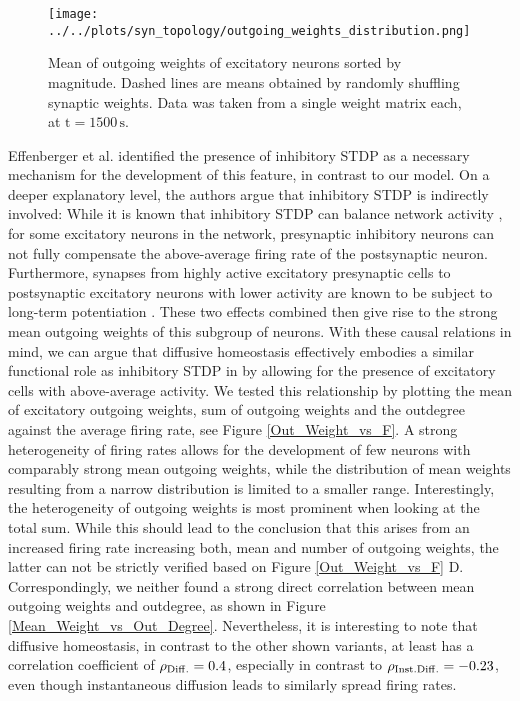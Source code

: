 \documentclass[10pt,a4paper]{article}
\begin{document}
\begin{figure}
\texttt{[image: ../../plots/syn\_topology/outgoing\_weights\_distribution.png]}
\caption[Mean of outgoing weights of excitatory neurons sorted by magnitude]{Mean of outgoing weights of excitatory neurons sorted by magnitude. Dashed lines are means obtained by randomly shuffling synaptic weights. Data was taken from a single weight matrix each, at $\mathrm{t = 1500\,s}$.}
\label{Out_Weight_Mean_Quantile}
\end{figure}

Effenberger et al. identified the presence of inhibitory STDP as a necessary mechanism for the development of this feature, in contrast to our model. On a deeper explanatory level, the authors argue that inhibitory STDP is indirectly involved: While it is known that inhibitory STDP can balance network activity \cite{Vogels_2011}, for some excitatory neurons in the network, presynaptic inhibitory neurons can not fully compensate the above-average firing rate of the postsynaptic neuron. Furthermore, synapses from highly active excitatory presynaptic cells to postsynaptic excitatory neurons with lower activity are known to be subject to long-term potentiation \cite{Sjoestroem_Syn_Plasticity_2001,Feldman_STDP_2012}. These two effects combined then give rise to the strong mean outgoing weights of this subgroup of neurons. With these causal relations in mind, we can argue that diffusive homeostasis effectively embodies a similar functional role as inhibitory STDP in \cite{Effenberger_2015} by allowing for the presence of excitatory cells with above-average activity. We tested this relationship by plotting the mean of excitatory outgoing weights, sum of outgoing weights and the outdegree against the average firing rate, see Figure \ref{Out_Weight_vs_F}. A strong heterogeneity of firing rates allows for the development of few neurons with comparably strong mean outgoing weights, while the distribution of mean weights resulting from a narrow distribution is limited to a smaller range. Interestingly, the heterogeneity of outgoing weights is most prominent when looking at the total sum. While this should lead to the conclusion that this arises from an increased firing rate increasing both, mean and number of outgoing weights, the latter can not be strictly verified based on Figure \ref{Out_Weight_vs_F} D. Correspondingly, we neither found a strong direct correlation between mean outgoing weights and outdegree, as shown in Figure \ref{Mean_Weight_vs_Out_Degree}. Nevertheless, it is interesting to note that diffusive homeostasis, in contrast to the other shown variants, at least has a correlation coefficient of $\rho_{\rm Diff.} =  0.4$, especially in contrast to $\rho_{\rm Inst. Diff.} =  -0.23$, even though instantaneous diffusion leads to similarly spread firing rates.
\end{document}
